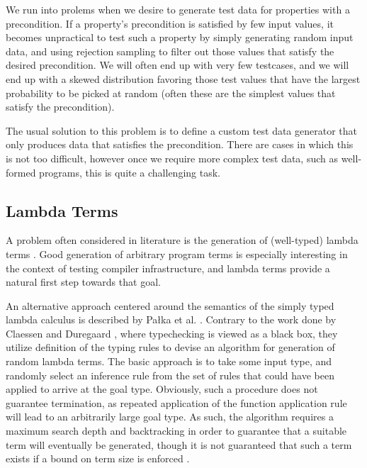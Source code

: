 \documentclass[a4paper,msc,twosized=semi]{uustthesis}
\begin{document}
  We run into prolems when we desire to generate test data for properties with a 
  precondition. If a property's precondition is satisfied by few input values, it 
  becomes unpractical to test such a property by simply generating random input data, 
  and using rejection sampling to filter out those values that satisfy the desired 
  precondition. We will often end up with very few testcases, and we will end up with 
  a skewed distribution favoring those test values that have the largest probability 
  to be picked at random (often these are the simplest values that satisfy the 
  precondition). 
  
  The usual solution to this problem is to define a custom test data generator that 
  only produces data that satisfies the precondition. There are cases in which this is 
  not too difficult, however once we require more complex test data, such as 
  well-formed programs, this is quite a challenging task. 

\subsection{Lambda Terms} 

  A problem often considered in literature is the generation of (well-typed) lambda 
  terms \cite{palka2011testing, grygiel2013counting, claessen2015generating}. Good 
  generation of arbitrary program terms is especially interesting in the context of 
  testing compiler infrastructure, and lambda terms provide a natural first step 
  towards that goal. 

  An alternative approach centered around the semantics of the simply typed lambda 
  calculus is described by Pa{\l}ka et al. \cite{palka2011testing}. Contrary to the 
  work done by Claessen and Duregaard \cite{claessen2015generating}, where 
  typechecking is viewed as a black box, they utilize definition of the typing rules 
  to devise an algorithm for generation of random lambda terms. The basic approach is 
  to take some input type, and randomly select an inference rule from the set of rules 
  that could have been applied to arrive at the goal type. Obviously, such a procedure 
  does not guarantee termination, as repeated application of the function application 
  rule will lead to an arbitrarily large goal type. As such, the algorithm requires a 
  maximum search depth and backtracking in order to guarantee that a suitable term 
  will eventually be generated, though it is not guaranteed that such a term exists if 
  a bound on term size is enforced \cite{moczurad2000statistical}. 
\end{document}
